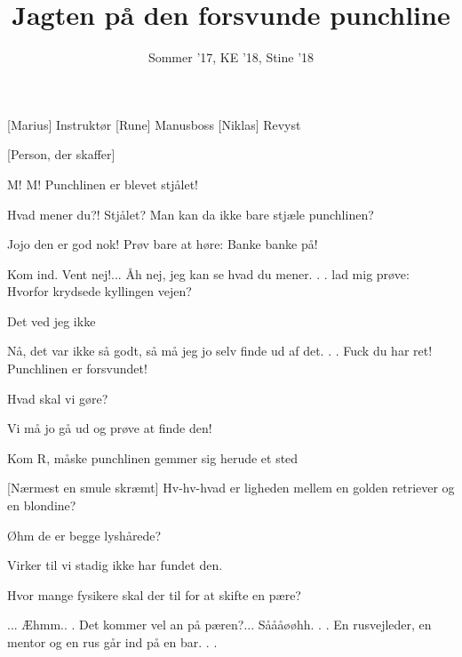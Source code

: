 \documentclass[a4paper,11pt]{article}
\title{Jagten på den forsvunde punchline}
\author{Sommer '17, KE '18, Stine '18}
\begin{document}
\maketitle

\begin{roles}
[Marius] Instruktør
[Rune] Manusboss
[Niklas] Revyst
\end{roles}

\begin{props}
[Person, der skaffer]
\end{props}


\begin{sketch}


 M! M! Punchlinen er blevet stjålet!

 Hvad mener du?! Stjålet? Man kan da ikke bare stjæle punchlinen?

 Jojo den er god nok! Prøv bare at høre: Banke banke på!

 Kom ind. Vent nej!... Åh nej, jeg kan se hvad du mener. . . lad mig prøve: Hvorfor krydsede kyllingen vejen?

 Det ved jeg ikke

 Nå, det var ikke så godt, så må jeg jo selv finde ud af det. . . Fuck du har ret! Punchlinen er forsvundet!

 Hvad skal vi gøre?

 Vi må jo gå ud og prøve at finde den!


 Kom R, måske punchlinen gemmer sig herude et sted


[Nærmest en smule skræmt] Hv-hv-hvad er ligheden mellem en golden retriever og en blondine?

  Øhm de er begge lyshårede?

 Virker til vi stadig ikke har fundet den.


 Hvor mange fysikere skal der til for at skifte en pære?

 ... Æhmm.. . Det kommer vel an på pæren?... Såååøøhh. . . En rusvejleder, en mentor og en rus går ind på en bar. . .


\end{sketch}
\end{document}
